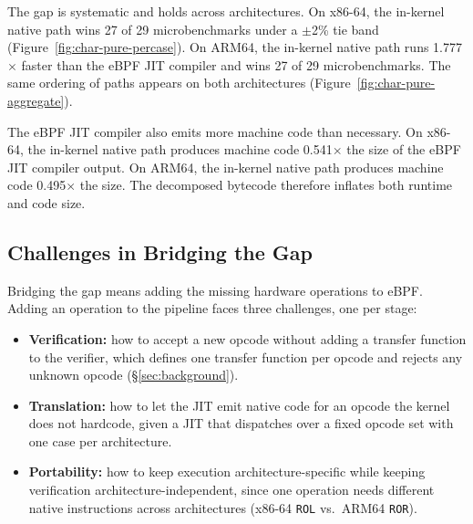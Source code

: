 

The gap is systematic and holds across architectures. On x86-64, the in-kernel native path wins 27 of 29 microbenchmarks under a $\pm$2\% tie band (Figure~\ref{fig:char-pure-percase}). On ARM64, the in-kernel native path runs 1.777$\times$ faster than the eBPF JIT compiler and wins 27 of 29 microbenchmarks. The same ordering of paths appears on both architectures (Figure~\ref{fig:char-pure-aggregate}).




The eBPF JIT compiler also emits more machine code than necessary. On x86-64, the in-kernel native path produces machine code 0.541$\times$ the size of the eBPF JIT compiler output. On ARM64, the in-kernel native path produces machine code 0.495$\times$ the size. The decomposed bytecode therefore inflates both runtime and code size.

\subsection{Challenges in Bridging the Gap}
\label{subsec:char-challenges}

Bridging the gap means adding the missing hardware operations to eBPF. Adding an operation to the pipeline faces three challenges, one per stage:

\begin{itemize}
  \item \textbf{Verification:} how to accept a new opcode without adding a transfer function to the verifier, which defines one transfer function per opcode and rejects any unknown opcode (\S\ref{sec:background}).
  \item \textbf{Translation:} how to let the JIT emit native code for an opcode the kernel does not hardcode, given a JIT that dispatches over a fixed opcode set with one case per architecture.
  \item \textbf{Portability:} how to keep execution architecture-specific while keeping verification architecture-independent, since one operation needs different native instructions across architectures (x86-64 \texttt{ROL} vs.\ ARM64 \texttt{ROR}).
\end{itemize}